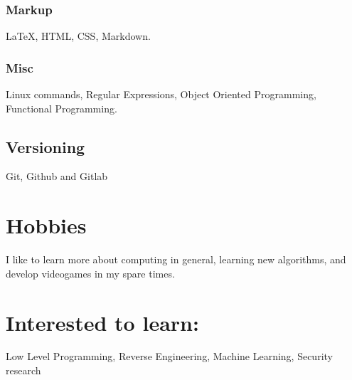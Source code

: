\documentclass{article}
\begin{document}
\subsubsection{Markup}

{\LaTeX}, HTML, CSS, Markdown.

\subsubsection{Misc}

Linux commands, Regular Expressions, Object Oriented Programming, Functional Programming.

\subsection{Versioning}

Git, Github and Gitlab

\section{Hobbies}

I like to learn more about computing in general, learning new algorithms, and develop videogames in my spare times.

\section{Interested to learn:}

Low Level Programming, Reverse Engineering, Machine Learning, Security research
\end{document}

